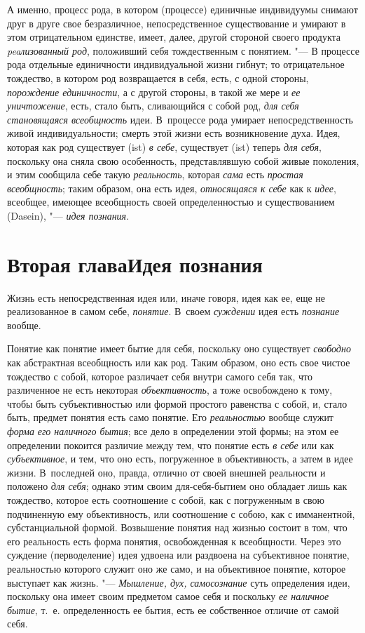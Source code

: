 А именно, процесс рода, в котором (процессе) единичные
индивидуумы снимают друг в друге свое безразличное, непосредственное
существование и умирают в этом отрицательном единстве, имеет, далее, другой
стороной своего продукта
{\em peaлизованный род},
положивший себя тождественным с понятием. "--- В
процессе рода отдельные единичности индивидуальной жизни гибнут; то
отрицательное тождество, в котором род возвращается в себя, есть, с одной
стороны, {\em порождение единичности},
а с другой стороны, в такой же мере и
{\em ее уничтожение},
есть, стало быть, сливающийся с собой род,
{\em для себя становящаяся всеобщность}
идеи. В~процессе рода умирает непосредственность живой
индивидуальности; смерть этой жизни есть возникновение духа. Идея, которая
как род существует (ist) {\em в себе},
существует (ist) теперь
{\em для себя}, поскольку
она сняла свою особенность, представлявшую собой живые поколения, и этим
сообщила себе такую {\em реальность},
которая {\em сама}
есть {\em простая
всеобщность}; таким образом, она есть идея,
{\em относящаяся к себе}
как к {\em идее},
всеобщее, имеющее всеобщность своей определенностью и
существованием (Dasein), "--- {\em идея
познания}.

\chapter[Вторая глава Идея познания]{Вторая глава\newline Идея познания}
Жизнь есть непосредственная идея или, иначе говоря, идея как
ее, еще не реализованное в самом себе,
{\em понятие}. В~своем
{\em суждении} идея есть
{\em познание} вообще.

Понятие как понятие имеет бытие для себя, поскольку оно
существует {\em свободно}
как абстрактная всеобщность или как род. Таким образом, оно
есть свое чистое тождество с собой, которое различает себя внутри самого
себя так, что различенное не есть некоторая
{\em объективность}, а
тоже освобождено к тому, чтобы быть субъективностью или формой простого
равенства с собой, и, стало быть, предмет понятия есть само понятие. Его
{\em реальностью} вообще
служит {\em форма}
{\em его наличного бытия};
все дело в определении этой формы; на этом ее определении
покоится различие между тем, что понятие есть
{\em в себе} или как
{\em субъективное}, и
тем, что оно есть, погруженное в объективность, а затем в идее жизни.
В~последней оно, правда, отлично от своей внешней реальности и положено
{\em для себя}; однако
этим своим для-себя-бытием оно обладает лишь как тождество, которое есть
соотношение с собой, как с погруженным в свою подчиненную ему
объективность, или соотношение с собою, как с имманентной, субстанциальной
формой. Возвышение понятия над жизнью состоит в том, что его реальность
есть форма понятия, освобожденная к всеобщности. Через это суждение
(перводеление) идея удвоена или раздвоена на субъективное понятие,
реальностью которого служит оно же само, и на объективное понятие, которое
выступает как жизнь. "--- {\em Мышление,
дух, самосознание} суть определения идеи, поскольку она
имеет своим предметом самое себя и поскольку
{\em ее наличное бытие},
т.~е. определенность ее бытия, есть ее собственное отличие от
самой себя.

